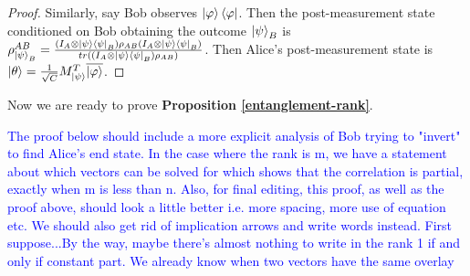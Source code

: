 \begin{proof}
Similarly, say Bob observes $\ket{\varphi}\bra{\varphi}$. Then the post-measurement state conditioned on Bob obtaining the outcome $\ket{\psi}_B$ is $\rho_{\ket{\psi}_B}^{AB}=\frac{(I_A \otimes \ket{\psi}\bra{\psi}_B  )\rho_{AB}(I_A \otimes \ket{\psi}\bra{\psi}_B)}{tr((I_A \otimes \ket{\psi}\bra{\psi}_B)\rho_{AB})}$.
Then Alice's post-measurement state is $\ket{\theta}=\frac{1}{\sqrt{C}} M_{\ket{\psi}}^T \overline{\ket{\varphi}}$.
\end{proof}

\bigskip
Now we are ready to prove \textbf{Proposition \ref{entanglement-rank}}.

\textcolor{blue}{The proof below should include a more explicit analysis of Bob trying to "invert" to find Alice's end state. In the case where the rank is m, we have a statement about which vectors can be solved for which shows that the correlation is partial, exactly when m is less than n.  Also, for final editing, this proof, as well as the proof above, should look a little better i.e. more spacing, more use of equation etc.  We should also get rid of implication arrows and write words instead.  First suppose...By the way, maybe there's almost nothing to write in the rank 1 if and only if constant part.  We already know when two vectors have the same overlay}



